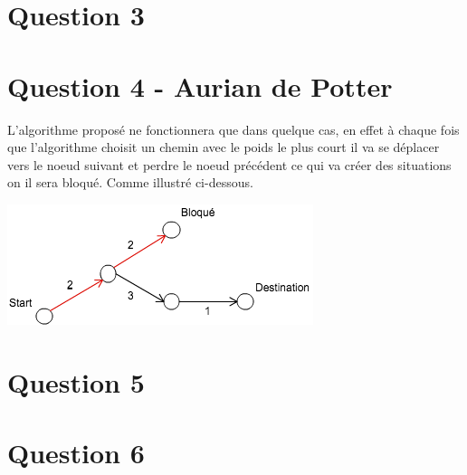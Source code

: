 \documentclass[10pt,a4paper]{article}
\begin{document}
\section*{Question 3}
\section*{Question 4 - Aurian de Potter}
L'algorithme proposé ne fonctionnera que dans quelque cas, en effet à chaque fois que l'algorithme choisit un chemin avec le poids le plus court il va se déplacer vers le noeud suivant et perdre le noeud précédent ce qui va créer des situations on il sera bloqué. Comme illustré ci-dessous.

\begin{center}
    \includegraphics[scale=0.7]{ex.png}
\end{center}

\section*{Question 5}
\section*{Question 6}
\end{document}

